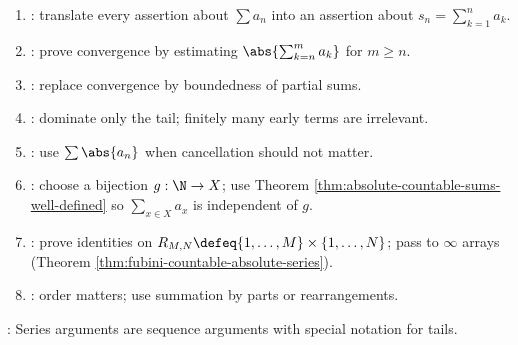 \begin{method} \label{meth:series-proof-patterns-source-todo}\label{meth:series-proof-patterns} 
\begin{enumerate}[label=(\roman*)]
\setlength{\itemsep}{0pt}
\item {}: translate every assertion about $\sum a_n$ into an assertion about $s_n=\sum_{k=1}^{n}a_k$.
\item {}: prove convergence by estimating $\abs{\sum_{k=n}^{m}a_k}$ for $m\geq n$.
\item {}: replace convergence by boundedness of partial sums.
\item {}: dominate only the tail; finitely many early terms are irrelevant.
\item {}: use $\sum\abs{a_n}$ when cancellation should not matter.
\item {}: choose a bijection $g:\N\to X$; use Theorem \ref{thm:absolute-countable-sums-well-defined} so $\sum_{x\in X}a_x$ is independent of $g$.
\item {}: prove identities on $R_{M,N}\defeq\{1,\ldots,M\}\times\{1,\ldots,N\}$; pass to $\infty$ arrays (Theorem \ref{thm:fubini-countable-absolute-series}).
\item {}: order matters; use summation by parts or rearrangements.
\end{enumerate}
: Series arguments are sequence arguments with special notation for tails.
\end{method}
